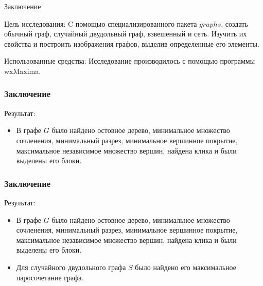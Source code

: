 \documentclass[c]{beamer}  %
\begin{document}
\begin{frame}{Заключение}
\begin{block}{Цель исследования:} C помощью специализированного пакета $graphs$, создать обычный граф, случайный двудольный граф, взвешенный и сеть. Изучить их свойства и построить изображения графов, выделив определенные его элементы.

\end{block}
\begin{block}{Использованные средства:} Исследование производилось с помощью программы wxMaxima.\\
\end{block}
\end{frame}

\begin{frame}
\frametitle{Заключение}
\begin{block}{Результат:} 
\begin{itemize}
\footnotesize
    \item В графе $G$ было найдено остовное дерево, минимальное множество сочленения, минимальный разрез, минимальное вершинное покрытие, максимальное независимое множество вершин, найдена клика и были выделены его блоки.

\end{itemize}	
\end{block}
 \end{frame}

\begin{frame}
\frametitle{Заключение}
\begin{block}{Результат:} 
\begin{itemize}
\footnotesize
    \item В графе $G$ было найдено остовное дерево, минимальное множество сочленения, минимальный разрез, минимальное вершинное покрытие, максимальное независимое множество вершин, найдена клика и были выделены его блоки.

    \item Для случайного двудольного графа $S$ было найдено его максимальное паросочетание графа.

\end{itemize}	
\end{block}
 \end{frame}
\end{document}
